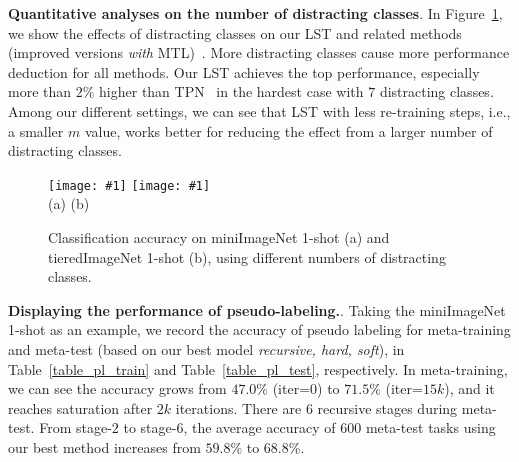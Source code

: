\documentclass{article}
\newcommand{\myparagraph}[1]{\vspace{0.1em}\noindent\textbf{#1}}
\begin{document}
\myparagraph{Quantitative analyses on the number of distracting classes}. 
In Figure~\ref{distractors_experiment}, we show the effects of distracting classes on our LST and related methods (improved versions \emph{with} MTL)~\cite{RenICLR2018_semisupervised, TarvainenNIPS17mean_teacher}.
More distracting classes cause more performance deduction for all methods.
Our LST achieves the top performance, especially more than $2\%$ higher than TPN~\cite{LiuICLR2019transductive} in the hardest case with $7$ distracting classes. 
Among our different settings, we can see that LST with less re-training steps, i.e., a smaller $m$ value, works better for reducing the effect from a larger number of distracting classes.
\begin{figure}[t]
\newcommand{\plotexpone}[1]{\texttt{[image: \#1]}}
\hspace*{0.5cm}
\plotexpone{plots/mini_plot.eps}
\hspace{1cm}
\plotexpone{plots/tiered_plot.eps}\\
\hspace*{3.30cm} (a) \hspace{6.55cm}(b)\\
\vspace{-0.5cm}
\caption{Classification accuracy on miniImageNet 1-shot (a) and tieredImageNet 1-shot (b), using different numbers of distracting classes.}
\vspace{-0.3cm}
\label{distractors_experiment}
\end{figure} 
\myparagraph{Displaying the performance of pseudo-labeling.}. Taking the miniImageNet 1-shot as an example, we record the accuracy of pseudo labeling for meta-training and meta-test (based on our best model \emph{recursive, hard, soft}), in Table~\ref{table_pl_train} and Table~\ref{table_pl_test}, respectively. 
In meta-training, we can see the accuracy grows from $47.0\%$ (iter=$0$) to $71.5\%$ (iter=$15k$), and it reaches saturation after $2k$ iterations.
There are $6$ recursive stages during meta-test. From stage-$2$ to stage-$6$, the average accuracy of $600$ meta-test tasks using our best method increases from $59.8\%$ to $68.8\%$. 
\end{document}

